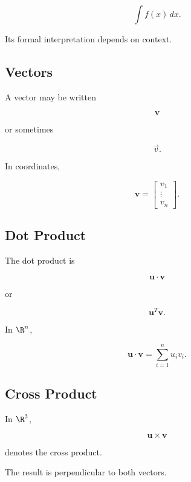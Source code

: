 \[
\boxed{
\int f(x)\,dx.
}
\]

Its formal interpretation depends on context.

\subsection{Vectors}
\label{subsec:vector-notation-reference}

A vector may be written

\[
\boxed{
\mathbf{v}
}
\]

or sometimes

\[
\boxed{
\vec{v}.
}
\]

In coordinates,

\[
\boxed{
\mathbf{v}
=
\begin{bmatrix}
v_1\\
\vdots\\
v_n
\end{bmatrix}.
}
\]

\subsection{Dot Product}
\label{subsec:dot-product-notation-reference}

The dot product is

\[
\boxed{
\mathbf{u}\cdot\mathbf{v}
}
\]

or

\[
\boxed{
\mathbf{u}^T\mathbf{v}.
}
\]

In \(\R^n\),

\[
\boxed{
\mathbf{u}\cdot\mathbf{v}
=
\sum_{i=1}^{n}u_iv_i.
}
\]

\subsection{Cross Product}
\label{subsec:cross-product-reference}

In \(\R^3\),

\[
\boxed{
\mathbf{u}\times\mathbf{v}
}
\]

denotes the cross product.

The result is perpendicular to both vectors.

